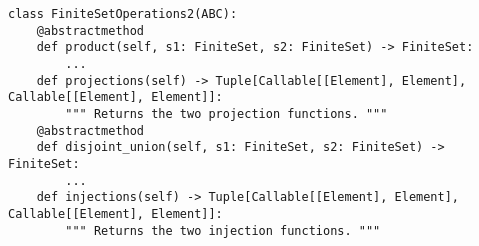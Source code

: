 \begin{verbatim}
class FiniteSetOperations2(ABC):
    @abstractmethod
    def product(self, s1: FiniteSet, s2: FiniteSet) -> FiniteSet:
        ...
    def projections(self) -> Tuple[Callable[[Element], Element], Callable[[Element], Element]]:
        """ Returns the two projection functions. """
    @abstractmethod
    def disjoint_union(self, s1: FiniteSet, s2: FiniteSet) -> FiniteSet:
        ...
    def injections(self) -> Tuple[Callable[[Element], Element], Callable[[Element], Element]]:
        """ Returns the two injection functions. """
\end{verbatim}